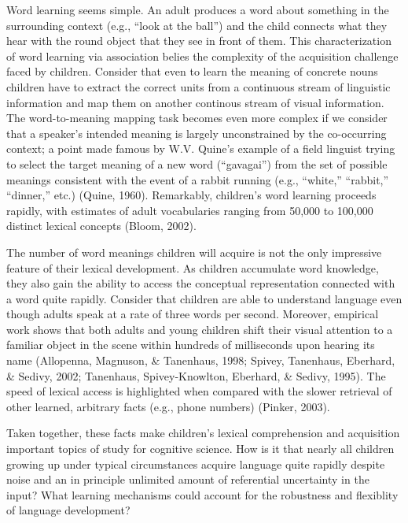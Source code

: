 \documentclass[oneside]{report}
\begin{document}
Word learning seems simple. An adult produces a word about something in
the surrounding context (e.g., ``look at the ball'') and the child
connects what they hear with the round object that they see in front of
them. This characterization of word learning via association belies the
complexity of the acquisition challenge faced by children. Consider that
even to learn the meaning of concrete nouns children have to extract the
correct units from a continuous stream of linguistic information and map
them on another continous stream of visual information. The
word-to-meaning mapping task becomes even more complex if we consider
that a speaker's intended meaning is largely unconstrained by the
co-occurring context; a point made famous by W.V. Quine's example of a
field linguist trying to select the target meaning of a new word
(``gavagai'') from the set of possible meanings consistent with the
event of a rabbit running (e.g., ``white,'' ``rabbit,'' ``dinner,''
etc.) (Quine, 1960). Remarkably, children's word learning proceeds
rapidly, with estimates of adult vocabularies ranging from 50,000 to
100,000 distinct lexical concepts (Bloom, 2002).

The number of word meanings children will acquire is not the only
impressive feature of their lexical development. As children accumulate
word knowledge, they also gain the ability to access the conceptual
representation connected with a word quite rapidly. Consider that
children are able to understand language even though adults speak at a
rate of three words per second. Moreover, empirical work shows that both
adults and young children shift their visual attention to a familiar
object in the scene within hundreds of milliseconds upon hearing its
name (Allopenna, Magnuson, \& Tanenhaus, 1998; Spivey, Tanenhaus,
Eberhard, \& Sedivy, 2002; Tanenhaus, Spivey-Knowlton, Eberhard, \&
Sedivy, 1995). The speed of lexical access is highlighted when compared
with the slower retrieval of other learned, arbitrary facts (e.g., phone
numbers) (Pinker, 2003).

Taken together, these facts make children's lexical comprehension and
acquisition important topics of study for cognitive science. How is it
that nearly all children growing up under typical circumstances acquire
language quite rapidly despite noise and an in principle unlimited
amount of referential uncertainty in the input? What learning mechanisms
could account for the robustness and flexiblity of language development?
\end{document}
